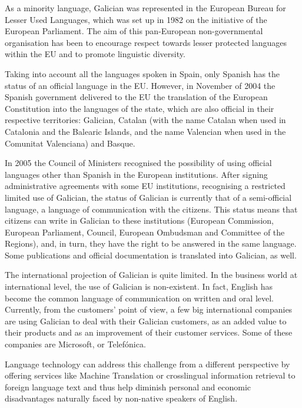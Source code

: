 \begin{multicols}{2}

As a minority language, Galician was represented in the European Bureau for Lesser Used Languages, which was set up in 1982 on the initiative of the European Parliament. The aim of this pan-European non-governmental organisation has been to encourage respect towards lesser protected languages within the EU and to promote linguistic diversity.

Taking into account all the languages spoken in Spain, only Spanish has the status of an official language in the EU.  However, in November of 2004 the Spanish government delivered to the EU the translation of the European Constitution into the languages of the state, which are also official in their respective territories: Galician, Catalan (with the name Catalan when used in Catalonia and the Balearic Islands, and the name Valencian when used in the Comunitat Valenciana) and Basque. 

In 2005 the Council of Ministers recognised the possibility of using official languages other than Spanish in the European institutions. After signing administrative agreements with some EU institutions, recognising a restricted limited use of Galician, the status of Galician is currently that of a semi-official language, a language of communication with the citizens. This status means that citizens can write in Galician to these institutions (European Commission, European Parliament, Council, European Ombudsman and Committee of the Regions), and, in turn, they have the right to be answered in the same language. Some publications and official documentation is translated into Galician, as well. 

The international projection of Galician is quite limited. In the business world at international level, the use of Galician is non-existent. In fact, English has become the common language of communication on written and oral level. Currently, from the customers' point of view, a few big international companies are using Galician to deal with their Galician customers, as an added value to their products and as an improvement of their customer services. Some of these companies are Microsoft, or Telefónica.

Language technology can address this challenge from a different perspective by offering services like Machine Translation or crosslingual information retrieval to foreign language text and thus help diminish personal and economic disadvantages naturally faced by non-native speakers of English.


\end{multicols}
